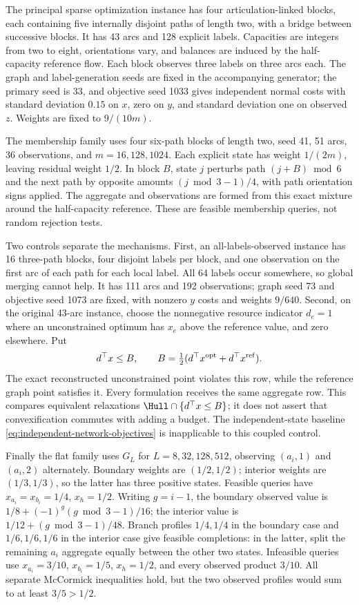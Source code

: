 The principal sparse optimization instance has four articulation-linked
blocks, each containing five internally disjoint paths of length two,
with a bridge between successive blocks. It has 43 arcs and 128 explicit
labels. Capacities are integers from two to eight, orientations vary, and
balances are induced by the half-capacity reference flow. Each block observes
three labels on three arcs each. The graph and label-generation seeds are
fixed in the accompanying generator; the primary seed is 33, and objective
seed 1033 gives independent normal costs with standard deviation $0.15$
on $x$, zero on $y$, and standard deviation one on observed $z$.
Weights are fixed to $9/(10m)$.

The membership family uses four six-path blocks of length two, seed 41,
51 arcs, 36 observations, and $m=16,128,1024$. Each explicit state has
weight $1/(2m)$, leaving residual weight $1/2$. In block $B$, state
$j$ perturbs path $(j+B)\bmod6$ and the next path by opposite amounts
$(j\bmod3-1)/4$, with path orientation signs applied. The aggregate
and observations are formed from this exact mixture around the half-capacity
reference. These are feasible membership queries, not random rejection tests.

Two controls separate the mechanisms. First, an all-labels-observed instance
has 16 three-path blocks, four disjoint labels per block, and one observation
on the first arc of each path for each local label. All 64 labels occur
somewhere, so global merging cannot help. It has 111 arcs and 192 observations;
graph seed 73 and objective seed 1073 are fixed, with nonzero $y$ costs and
weights $9/640$. Second, on the original 43-arc instance, choose the
nonnegative resource indicator $d_e=1$ where an unconstrained optimum has
$x_e$ above the reference value, and zero elsewhere. Put
\[
 d^\top x\le B,\qquad
 B=\tfrac12(d^\top x^{\rm opt}+d^\top x^{\rm ref}).
\]
The exact reconstructed unconstrained point violates this row, while the
reference graph point satisfies it. Every formulation receives the same
aggregate row. This compares equivalent relaxations $\Hull\cap\{d^\top x\le B\}$;
it does not assert that convexification commutes with adding a budget.
The independent-state baseline \eqref{eq:independent-network-objectives}
is inapplicable to this coupled control.

Finally the flat family uses $G_L$ for $L=8,32,128,512$, observing
$(a_i,1)$ and $(a_i,2)$ alternately. Boundary weights are $(1/2,1/2)$;
interior weights are $(1/3,1/3)$, so the latter has three positive
states. Feasible queries have $x_{a_i}=x_{b_i}=1/4$, $x_h=1/2$.
Writing $g=i-1$, the boundary observed value is
$1/8+(-1)^g(g\bmod3-1)/16$; the interior value is
$1/12+(g\bmod3-1)/48$. Branch profiles $1/4,1/4$ in the boundary
case and $1/6,1/6,1/6$ in the interior case give feasible completions:
in the latter, split the remaining $a_i$ aggregate equally between
the other two states. Infeasible queries use
$x_{a_i}=3/10$, $x_{b_i}=1/5$, $x_h=1/2$, and every observed
product $3/10$. All separate McCormick inequalities hold, but the
two observed profiles would sum to at least $3/5>1/2$.

